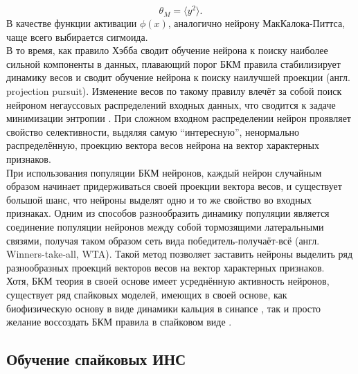\documentclass[a4paper,10pt]{article}
\begin{document}
\begin{equation}
\theta_{M} = \langle y^2 \rangle.
\end{equation}
\indent В качестве функции активации $\phi(x)$, аналогично нейрону МакКалока-Питтса, чаще всего выбирается сигмоида.\\ 
\indent В то время, как правило Хэбба сводит обучение нейрона к поиску наиболее сильной компоненты в данных, плавающий порог БКМ правила стабилизирует динамику весов и сводит обучение нейрона к поиску наилучшей проекции \cite{friedman1973projection} (англ. projection pursuit). Изменение весов по такому правилу влечёт за собой поиск нейроном негауссовых распределений входных данных, что сводится к задаче минимизации энтропии \cite{bcm_book}. При сложном входном распределении нейрон проявляет свойство селективности, выдяляя самую ``интересную'', ненормально распределённую, проекцию вектора весов нейрона на вектор характерных признаков.\\
\indent При использования популяции БКМ нейронов, каждый нейрон случайным образом начинает придерживаться своей проекции вектора весов, и существует большой шанс, что нейроны выделят одно и то же свойство во входных признаках. Одним из способов разнообразить динамику популяции является соединение популяции нейронов между собой тормозящими латеральными связями, получая таком образом сеть вида победитель-получаёт-всё (англ. Winners-take-all, WTA). Такой метод позволяет заставить нейроны выделить ряд разнообразных проекций векторов весов на вектор характерных признаков.\\
\indent Хотя, БКМ теория в своей основе имеет усреднённую активность нейронов, существует ряд спайковых моделей, имеющих в своей основе, как биофизическую основу в виде динамики кальция в синапсе \cite{ShouvalCaBCM}, так и просто желание воссоздать БКМ правила в спайковом виде \cite{PfisterTriple}.
\subsection{Обучение спайковых ИНС}
\end{document}

